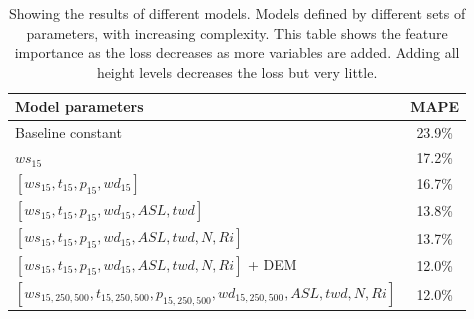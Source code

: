 \begin{table}[h]
    \caption[Model results for different sets of parameters.]{Showing the results of different models. Models defined by different sets of parameters, with increasing complexity. This table shows the feature importance as the loss decreases as more variables are added. Adding all height levels decreases the loss but very little.}
    \label{table:setsOfParams}
    \centering
    \begin{tabular}{lc}
        \toprule
        \textbf{Model parameters} & \textbf{MAPE}\\
        \midrule
        Baseline constant & 23.9\%\\
        $ws_{15}$ & 17.2\%\\
        $[ws_{15}, t_{15}, p_{15}, wd_{15}]$ & 16.7\% \\
        $[ws_{15}, t_{15}, p_{15}, wd_{15}, ASL, twd]$ & 13.8\% \\
        $[ws_{15}, t_{15}, p_{15}, wd_{15}, ASL, twd, N, Ri]$ & 13.7\%\\
        $[ws_{15}, t_{15}, p_{15}, wd_{15}, ASL, twd, N, Ri]$ + DEM & 12.0\%\\
        $[ws_{15,250,500}, t_{15,250,500}, p_{15,250,500}, wd_{15,250,500}, ASL, twd, N, Ri]$ & 12.0\% \\
        \bottomrule
    \end{tabular}
\end{table}